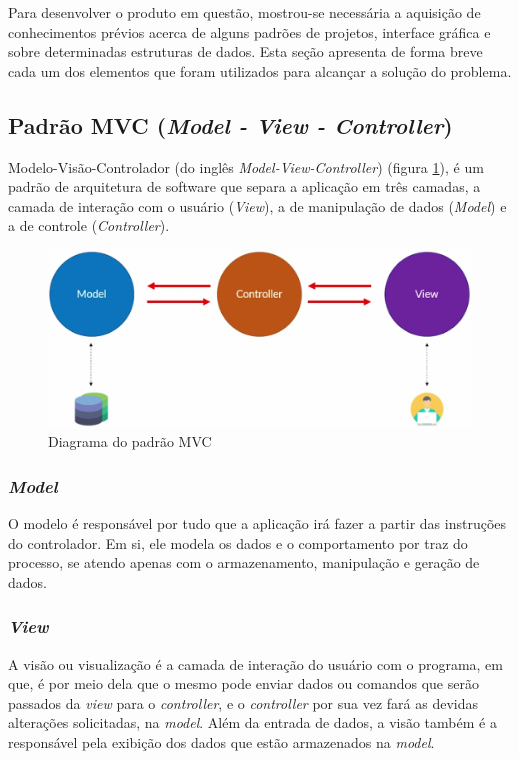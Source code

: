 \documentclass[12pt]{article}
\begin{document}
Para desenvolver o produto em questão, mostrou-se necessária a aquisição de conhecimentos prévios acerca de alguns padrões de projetos, interface gráfica e sobre determinadas estruturas de dados. Esta seção apresenta de forma breve cada um dos elementos que foram utilizados para alcançar a solução do problema.

\subsection{Padrão MVC ({\itshape Model - View - Controller})}
Modelo-Visão-Controlador (do inglês {\itshape Model-View-Controller}) (figura \ref{fig: diagramaMVC}), é um padrão de arquitetura de software que separa a aplicação em três camadas, a camada de interação com o usuário ({\itshape View}), a de manipulação de dados ({\itshape Model}) e a de controle ({\itshape Controller}).
\begin{figure}[H]
    \centering
    \includegraphics[width=.7\textwidth]{diagrama-do-padrao-mvc.png}
    \caption{Diagrama do padrão MVC \cite{diagramaMVC}}
    \label{fig: diagramaMVC}
\end{figure}

\subsubsection{\itshape{Model}}
O modelo é responsável por tudo que a aplicação irá fazer a partir das instruções do controlador. Em si, ele modela os dados e o comportamento por traz do processo, se atendo apenas com o armazenamento, manipulação e geração de dados.
\subsubsection{\itshape{View}}
A visão ou visualização é a camada de interação do usuário com o programa, em que, é por meio dela que o mesmo pode enviar dados ou comandos que serão passados da {\itshape view} para o {\itshape controller}, e o {\itshape controller} por sua vez fará as devidas alterações solicitadas, na {\itshape model}. Além da entrada de dados, a visão também é a responsável pela exibição dos dados que estão armazenados na {\itshape model}.
\end{document}
